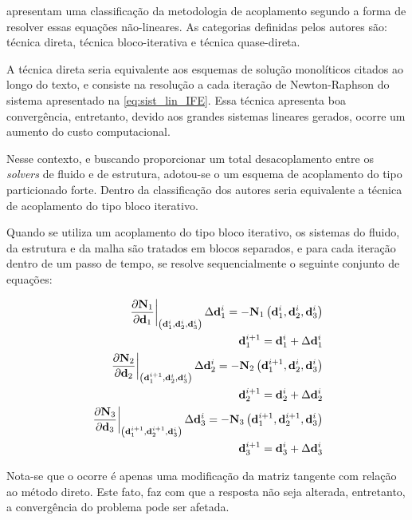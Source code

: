   apresentam uma classificação da metodologia de acoplamento segundo a forma de resolver essas equações não-lineares. As categorias definidas pelos autores são: técnica direta, técnica bloco-iterativa e técnica quase-direta. 

A técnica direta seria equivalente aos esquemas de solução monolíticos citados ao longo do texto, e consiste na resolução a cada iteração de Newton-Raphson do sistema apresentado na \autoref{eq:sist_lin_IFE}. Essa técnica apresenta boa convergência, entretanto, devido aos grandes sistemas lineares gerados, ocorre um aumento do custo computacional.

Nesse contexto, e buscando proporcionar um total desacoplamento entre os \textit{solvers} de fluido e de estrutura, adotou-se o um esquema de acoplamento do tipo particionado forte. Dentro da classificação dos autores  seria equivalente a técnica de acoplamento do tipo bloco iterativo.

Quando se utiliza um acoplamento do tipo bloco iterativo, os sistemas do fluido, da estrutura e da malha são tratados em blocos separados, e para cada iteração dentro de um passo de tempo, se resolve sequencialmente o seguinte conjunto de equações:

\begin{align}
	\left .\frac{\partial\mathbf{N}_{1}}{\partial\mathbf{d}_{1}}\right|_{\left(\mathbf{d}_{1}^{i},\mathbf{d}_{2}^{i},\mathbf{d}_{3}^{i}\right)} \Delta\mathbf{d}_{1}^{i} = - \mathbf{N}_{1}\left(\mathbf{d}_{1}^{i},\mathbf{d}_{2}^{i},\mathbf{d}_{3}^{i}\right)  \label{eq:lin_fluido} \\
	\mathbf{d}_{1}^{i+1} =  \mathbf{d}_{1}^{i} + \Delta\mathbf{d}_{1}^{i} \label{eq:atu_fluido}	\\
	\left.\frac{\partial\mathbf{N}_{2}}{\partial\mathbf{d}_{2}}\right|_{\left(\mathbf{d}_{1}^{i+1},\mathbf{d}_{2}^{i},\mathbf{d}_{3}^{i}\right)} \Delta\mathbf{d}_{2}^{i} = - \mathbf{N}_{2}\left(\mathbf{d}_{1}^{i+1},\mathbf{d}_{2}^{i},\mathbf{d}_{3}^{i}\right) \label{eq:lin_est}\\
	\mathbf{d}_{2}^{i+1} =  \mathbf{d}_{2}^{i} + \Delta\mathbf{d}_{2}^{i} \label{eq:atu_est}\\
	\left.\frac{\partial\mathbf{N}_{3}}{\partial\mathbf{d}_{3}}\right|_{\left(\mathbf{d}_{1}^{i+1},\mathbf{d}_{2}^{i+1},\mathbf{d}_{3}^{i}\right)} \Delta\mathbf{d}_{3}^{i} = - \mathbf{N}_{3}\left(\mathbf{d}_{1}^{i+1},\mathbf{d}_{2}^{i+1},\mathbf{d}_{3}^{i}\right) \label{eq:lin_malha}\\
	\mathbf{d}_{3}^{i+1} =  \mathbf{d}_{3}^{i} + \Delta\mathbf{d}_{3}^{i}  \label{eq:atu_malha}
\end{align}

Nota-se que o ocorre é apenas uma modificação da matriz tangente com relação ao método direto. Este fato, faz com que a resposta não seja alterada, entretanto, a convergência do problema pode ser afetada. 

